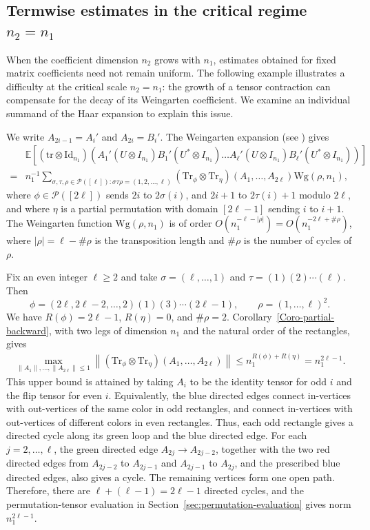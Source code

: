 \documentclass[12pt]{article}
\numberwithin{equation}{section}
\theoremstyle{plain}
\def\bE{\mathbb E}
\def\cP{\mathcal P}
\def\id{\mathrm {Id}}
\def\Tr{\mathrm {Tr}}
\def\tr{\mathrm {tr}}
\def\Wg{\mathrm {Wg}}
\begin{document}
\subsection{Termwise estimates in the critical regime \texorpdfstring{$n_2=n_1$}{n2 = n1}}
When the coefficient dimension $n_2$ grows with $n_1$, estimates obtained for fixed matrix coefficients need not remain uniform. The following example illustrates a difficulty at the critical scale $n_2=n_1$: the growth of a tensor contraction can compensate for the decay of its Weingarten coefficient. We examine an individual summand of the Haar expansion to explain this issue.

We write $A_{2i-1}=A_i'$ and $A_{2i}=B_i'$. The Weingarten expansion (see \cite[Corollaries~2.4 and~2.7]{CollinsSnady2006}) gives
\begin{align*}
    & \bE \left[ (\tr \otimes \id_{n_1}) \left( A_1' (U \otimes I_{n_1}) B_1' (U^* \otimes I_{n_1}) \ldots A_\ell' (U \otimes I_{n_1}) B_\ell' (U^* \otimes I_{n_1}) \right) \right] \\
    =& n_1^{-1} \sum_{\sigma,\tau,\rho\in \cP([\ell]): \sigma\tau\rho=(1,2,\ldots ,\ell)} (\Tr_{\phi} \otimes \Tr_\eta) \left( A_1, \ldots, A_{2\ell} \right) \Wg(\rho,n_1),
\end{align*}
where $\phi \in \cP([2\ell])$ sends $2i$ to $2\sigma (i)$, and $2i+1$ to $2\tau (i)+1$ modulo $2\ell$, and where $\eta$ is a partial permutation with domain $[2\ell-1]$ sending $i$ to $i+1$. The Weingarten function $\Wg(\rho,n_1)$ is of order $O(n_1^{-\ell-|\rho|}) = O(n_1^{-2\ell+\#\rho})$, where $|\rho|=\ell-\#\rho$ is the transposition length and $\#\rho$ is the number of cycles of $\rho$.

Fix an even integer $\ell\ge2$ and take $\sigma=(\ell,\ldots,1)$ and $\tau=(1)(2)\cdots(\ell)$. Then
\[
\phi=(2\ell,2\ell-2,\ldots,2)(1)(3)\cdots(2\ell-1),
\qquad \rho=(1,\ldots,\ell)^2.
\]
We have $R(\phi)=2\ell-1$, $R(\eta)=0$, and $\#\rho=2$. Corollary~\ref{Coro-partial-backward}, with two legs of dimension $n_1$ and the natural order of the rectangles, gives
\begin{align}
\max_{\|A_1\|,\ldots,\|A_{2\ell}\|\le1}
\left\|(\Tr_\phi\otimes\Tr_\eta)(A_1,\ldots,A_{2\ell})\right\|
\le n_1^{R(\phi)+R(\eta)}=n_1^{2\ell-1}.
\end{align}
This upper bound is attained by taking $A_i$ to be the identity tensor for odd $i$ and the flip tensor for even $i$. Equivalently, the blue directed edges connect in-vertices with out-vertices of the same color in odd rectangles, and connect in-vertices with out-vertices of different colors in even rectangles. Thus, each odd rectangle gives a directed cycle along its green loop and the blue directed edge. For each $j=2,\ldots,\ell$, the green directed edge $A_{2j}\to A_{2j-2}$, together with the two red directed edges from $A_{2j-2}$ to $A_{2j-1}$ and $A_{2j-1}$ to $A_{2j}$, and the prescribed blue directed edges, also gives a cycle.
The remaining vertices form one open path. Therefore, there are $\ell+(\ell-1)=2\ell-1$ directed cycles, and the permutation-tensor evaluation in Section~\ref{sec:permutation-evaluation} gives norm $n_1^{2\ell-1}$.
\end{document}
